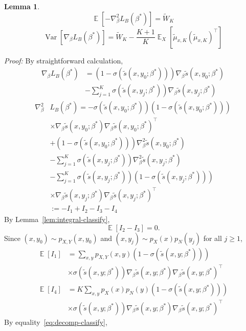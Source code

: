 \documentclass[11pt,a4paper]{article}
\DeclareMathOperator{\E}{\mathbb{E}}
\newcommand{\var}{\operatorname{Var}}
\newcommand{\wt}[1]{\widetilde{#1}}
\newcommand{\gbeta}{\nabla_{\beta}}
\newcommand{\px}{p_X}
\newcommand{\sbc}[3]{\wt{s}(#1, #2; #3)}
\newcommand{\wbk}{\wt{W}_{K}}
\newcommand{\mubxk}{\wt{\mu}_{x, K}}
\newtheorem{lemma}{Lemma}[section]
\begin{document}
\begin{lemma}
  \[
  \E[-\gbeta^2 L_B (\beta^*)] = \wbk
  \]
  \[
  \var \left[\gbeta L_B(\beta^*) \right] = \wbk - \frac{K+1}{K}\E_{X}[\mubxk  (\mubxk)^\top ]
  \]
  \label{lem:variance-binary}
\end{lemma}
{\em Proof: }
By straightforward calculation,
\begin{equation*}
\begin{aligned}
  \gbeta L_B(\beta^*) & = \left( 1- \sigma(\sbc{x}{y_0}{\beta^*}) \right) \gbeta\sbc{x}{y_0}{\beta^*}  \\
 & - \sum_{j=1}^K \sigma(\sbc{x}{y_j}{\beta^*}) \gbeta\sbc{x}{y_j}{\beta^*}  
\end{aligned}
\end{equation*}
\begin{equation*}
\begin{aligned}
  \gbeta^2 & L_B(\beta^*)  = -\sigma(\sbc{x}{y_0}{\beta^*}) (1-\sigma(\sbc{x}{y_0}{\beta^*})) \\
  & \times \gbeta\sbc{x}{y_0}{\beta^*}\gbeta\sbc{x}{y_0}{\beta^*}^\top\\
  & + (1-\sigma(\sbc{x}{y_0}{\beta^*}))\gbeta^2\sbc{x}{y_0}{\beta^*} \\
  &  -  \sum_{j=1}^K \sigma(\sbc{x}{y_j}{\beta^*})\gbeta^2 \sbc{x}{y_j}{\beta^*}\\
  & - \sum_{j=1}^K \sigma(\sbc{x}{y_j}{\beta^*}) (1-\sigma(\sbc{x}{y_j}{\beta^*}))  \\
  & \times \gbeta \sbc{x}{y_j}{\beta^*}\gbeta \sbc{x}{y_j}{\beta^*}^\top\\
  & := -I_1+I_2-I_3-I_4
\end{aligned}
\end{equation*}
By Lemma~\ref{lem:integral-classify}, 
\[
\E[I_2 - I_3] = 0.
\]
Since $(x, y_0)\sim p_{X, Y}(x, y_0)$ and $(x, y_j)\sim p_X(x)p_N(y_j)$ for all $j\geq 1$, 
\begin{equation*}
\begin{aligned}
 \E[I_1] &= \sum_{x, y}p_{X, Y}(x, y) (1-\sigma(\sbc{x}{y}{\beta^*}))\\
 & \times \sigma(\sbc{x}{y}{\beta^*})  \gbeta\sbc{x}{y}{\beta^*}\gbeta\sbc{x}{y}{\beta^*}^\top\\
  \E[I_4] &= K \sum_{x, y}\px(x)p_N(y)(1-\sigma(\sbc{x}{y}{\beta^*})) \\
  & \times  \sigma(\sbc{x}{y}{\beta^*})\gbeta\sbc{x}{y}{\beta^*}\gbeta\sbc{x}{y}{\beta^*}^\top
\end{aligned}
\end{equation*}
By equality~\eqref{eq:decomp-classify}, 
\end{document}
